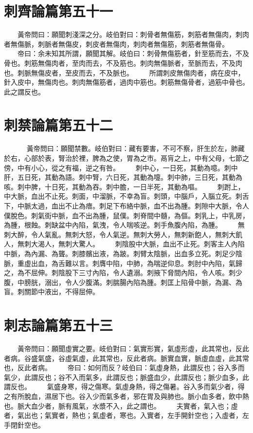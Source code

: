 \section{刺齊論篇第五十一}

　　黃帝問曰：願聞刺淺深之分。岐伯對曰：刺骨者無傷筋，刺筋者無傷肉，刺肉者無傷脈，刺脈者無傷皮，刺皮者無傷肉，刺肉者無傷筋，刺筋者無傷骨。
　　帝曰：余未知其所謂，願聞其解。岐伯曰：刺骨無傷筋者，針至筋而去，不及骨也。刺筋無傷肉者，至肉而去，不及筋也。刺肉無傷脈者，至脈而去，不及肉也。刺脈無傷皮者，至皮而去，不及脈也。
　　所謂刺皮無傷肉者，病在皮中，針入皮中，無傷肉也。刺肉無傷筋者，過肉中筋也。刺筋無傷骨者，過筋中骨也。此之謂反也。


\section{刺禁論篇第五十二}
　
　　黃帝問曰：願聞禁數。岐伯對曰：藏有要害，不可不察，肝生於左，肺藏於右，心部於表，腎治於裡，脾為之使，胃為之市。鬲肓之上，中有父母，七節之傍，中有小心，從之有福，逆之有咎。
　　刺中心，一日死，其動為噫。刺中肝，五日死，其動為語。刺中腎，六日死，其動為嚏。刺中肺，三日死，其動為咳。刺中脾，十日死，其動為吞。刺中膽，一日半死，其動為嘔。
　　刺跗上，中大脈，血出不止死。刺面，中溜脈，不幸為盲。刺頭，中腦戶，入腦立死。刺舌下，中脈太過，血出不止為瘖。刺足下布絡中脈，血不出為腫。刺隙中大脈，令人僕脫色。刺氣街中脈，血不出為腫，鼠僕。刺脊間中髓，為傴。刺乳上，中乳房，為腫，根蝕。刺缺盆中內陷，氣洩，令人喘咳逆。刺手魚腹內陷，為腫。
　　無刺大醉，令人氣亂。無刺大怒，令人氣逆。無刺大勞人，無刺新飽人，無刺大飢人，無刺大渴人，無刺大驚人。
　　刺陰股中大脈，血出不止死。刺客主人內陷中脈，為內漏、為聾。刺膝髕出液，為跛。刺臂太陰脈，出血多立死。刺足少陰脈，重虛出血，為舌難以言。刺膺中陷，中肺，為喘逆仰息。刺肘中內陷，氣歸之，為不屈伸。刺陰股下三寸內陷，令人遺溺。刺掖下脅間內陷，令人咳。刺少腹，中膀胱，溺出，令人少腹滿。刺腨腸內陷為腫。刺匡上陷骨中脈，為漏、為盲。刺關節中液出，不得屈伸。


\section{刺志論篇第五十三}

　　黃帝問曰：願聞虛實之要。岐伯對曰：氣實形實，氣虛形虛，此其常也，反此者病。谷盛氣盛，谷虛氣虛，此其常也，反此者病。脈實血實，脈虛血虛，此其常也，反此者病。
　　帝曰：如何而反？岐伯曰：氣虛身熱，此謂反也；谷入多而氣少，此謂反也；谷不入而氣多，此謂反也；脈盛血少，此謂反也；脈少血多，此謂反也。
　　氣盛身寒，得之傷寒。氣虛身熱，得之傷暑。谷入多而氣少者，得之有所脫血，濕居下也。谷入少而氣多者，邪在胃及與肺也。脈小血多者，飲中熱也。脈大血少者，脈有風氣，水漿不入，此之謂也。
　　夫實者，氣入也；虛者，氣出也；氣實者，熱也；氣虛者，寒也。入實者，左手開針空也；入虛者，左手閉針空也。


